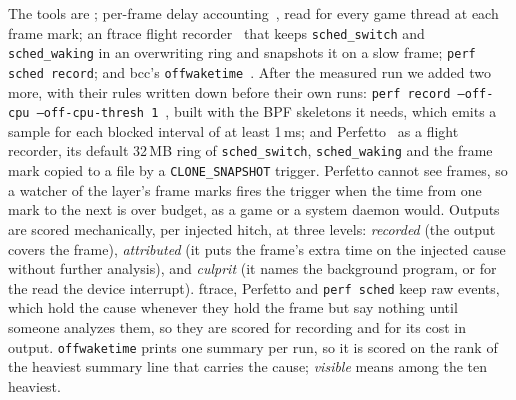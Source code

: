 The tools are \sys; per-frame delay accounting~\cite{delayacct}, read for
every game thread at each frame mark; an ftrace flight
recorder~\cite{ftracehist} that keeps \texttt{sched\_switch} and
\texttt{sched\_waking} in an overwriting ring and snapshots it on a slow
frame; \texttt{perf sched record}; and bcc's
\texttt{offwaketime}~\cite{gregg2019bpf}. After the measured run we added two more, with
their rules written down before their own runs: \texttt{perf record
--off-cpu --off-cpu-thresh 1}~\cite{perf-offcpu-thresh}, built with the BPF
skeletons it needs, which emits a sample for each blocked interval of at
least 1\,ms; and Perfetto~\cite{perfetto-triggers} as a flight recorder, its
default 32\,MB ring of \texttt{sched\_switch}, \texttt{sched\_waking} and
the frame mark copied to a file by a \texttt{CLONE\_SNAPSHOT} trigger.
Perfetto cannot see frames, so a watcher of the layer's frame marks fires
the trigger when the time from one mark to the next is over budget, as a
game or a system daemon would. Outputs are scored mechanically, per injected
hitch, at three levels: \emph{recorded} (the output covers the frame),
\emph{attributed} (it puts the frame's extra time on the injected cause
without further analysis), and \emph{culprit} (it names the background
program, or for the read the device interrupt). ftrace, Perfetto and
\texttt{perf sched} keep raw events, which hold the cause whenever they hold the frame but
say nothing until someone analyzes them, so they are scored for recording
and for its cost in output. \texttt{offwaketime}
prints one summary per run, so it is scored on the rank of the heaviest
summary line that carries the cause; \emph{visible} means among the ten
heaviest.

\begin{table}[t]
\centering
\footnotesize

\caption{Rare hitches (VM; one injection every 10\,s, one 120\,s run per
case and tool). Counts differ between tools because a burst makes a hitch
only when it lands in a frame without slack: same mechanism, not the same
frames. \texttt{mem} and \texttt{cpuspike} have no culprit. The \texttt{ipc}
row ``with queued holder'' reruns \sys alone after the change of
\autoref{sec:chain}; perf \texttt{--off-cpu} and Perfetto ran later, each in
a run of its own. $^\ast$The whole summary, divided by the injected
hitches.}
\label{tab:catch}
\end{table}

